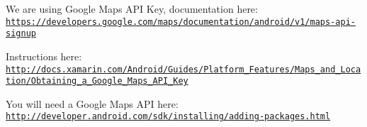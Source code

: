 We are using Google Maps A\+P\+I Key, documentation here\+: \href{https://developers.google.com/maps/documentation/android/v1/maps-api-signup}{\tt https\+://developers.\+google.\+com/maps/documentation/android/v1/maps-\/api-\/signup}

Instructions here\+: \href{http://docs.xamarin.com/Android/Guides/Platform_Features/Maps_and_Location/Obtaining_a_Google_Maps_API_Key}{\tt http\+://docs.\+xamarin.\+com/\+Android/\+Guides/\+Platform\+\_\+\+Features/\+Maps\+\_\+and\+\_\+\+Location/\+Obtaining\+\_\+a\+\_\+\+Google\+\_\+\+Maps\+\_\+\+A\+P\+I\+\_\+\+Key}

You will need a Google Maps A\+P\+I here\+: \href{http://developer.android.com/sdk/installing/adding-packages.html}{\tt http\+://developer.\+android.\+com/sdk/installing/adding-\/packages.\+html} 
